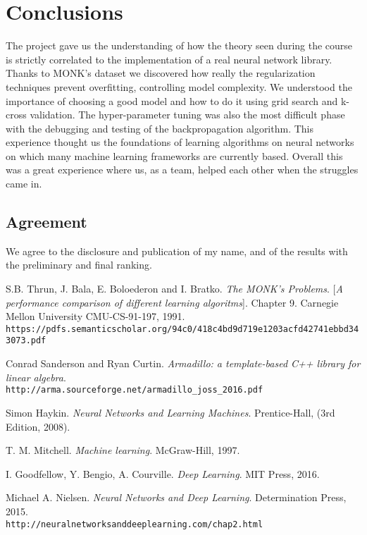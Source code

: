 \section{Conclusions}
The project gave us the understanding of how the theory seen during the course is strictly correlated to the implementation of a real neural network library. Thanks to MONK's dataset we discovered how really the regularization techniques prevent overfitting, controlling model complexity. We understood the importance of choosing a good model and how to do it using grid search and k-cross validation. The hyper-parameter tuning was also the most difficult phase with the debugging and testing of the backpropagation algorithm. This experience thought us the foundations of learning algorithms on neural networks on which many machine learning frameworks are currently based. Overall this was a great experience where us, as a team, helped each other when the struggles came in.
\subsection{Agreement}
We agree to the disclosure and publication of my name, and of the results with the
preliminary and final ranking.


\begin{thebibliography}{9}
	S.B. Thrun, J. Bala, E. Boloederon and I. Bratko.
	\textit{The MONK's Problems}. 
	[\textit{A performance comparison of different learning algoritms}]. Chapter 9.
	Carnegie Mellon University CMU-CS-91-197, 1991.
	\\\texttt{https://pdfs.semanticscholar.org/94c0/418c4bd9d719e1203acfd42741ebbd343073.pdf}
	
	Conrad Sanderson and Ryan Curtin. 
	\textit{Armadillo: a template-based C++ library for linear algebra}. 
	\\\texttt{http://arma.sourceforge.net/armadillo\_joss\_2016.pdf}

	
	Simon Haykin. 
	\textit{Neural Networks and Learning Machines}. 
	Prentice-Hall, (3rd Edition, 2008).


	T. M. Mitchell. 
	\textit{Machine learning}. 
	McGraw-Hill, 1997.
	
	I. Goodfellow, Y. Bengio, A. Courville. 
	\textit{Deep Learning}. 
	MIT Press,  2016.
	
	Michael A. Nielsen. 
	\textit{Neural Networks and Deep Learning}. 
	Determination Press, 2015.
	\\\texttt{http://neuralnetworksanddeeplearning.com/chap2.html}
\end{thebibliography}



